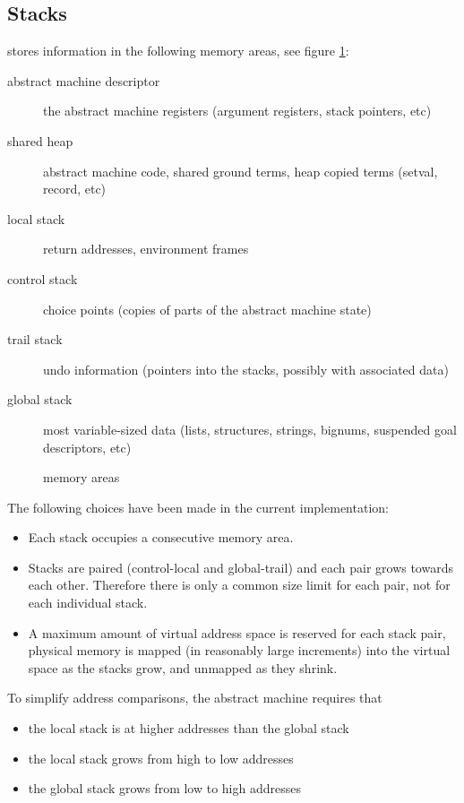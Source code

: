 \subsection{Stacks}
{\eclipse} stores information in the following memory areas, see figure
\ref{figstacks}:
\begin{description}
\item[abstract machine descriptor] the abstract machine registers
        (argument registers, stack pointers, etc)
\item[shared heap] abstract machine code, shared ground terms,
        heap copied terms (setval, record, etc)
\item[local stack] return addresses, environment frames
\item[control stack] choice points (copies of parts of the
        abstract machine state)
\item[trail stack] undo information (pointers into the stacks, possibly
        with associated data)
\item[global stack] most variable-sized data (lists, structures,
        strings, bignums, suspended goal descriptors, etc)
\end{description}
\begin{figure}
\label{figstacks}
\caption{{\eclipse} memory areas}
\end{figure}
The following choices have been made in the current implementation:
\begin{itemize}
\item Each stack occupies a consecutive memory area.
\item Stacks are paired (control-local and global-trail) and each pair
        grows towards each other.
        Therefore there is only a common size limit for each pair,
        not for each individual stack.
\item A maximum amount of virtual address space is reserved for each
        stack pair, physical memory is mapped (in reasonably large increments)
        into the virtual space as the stacks grow, and unmapped as they
        shrink.
\end{itemize}
To simplify address comparisons, the abstract machine requires that
\begin{itemize}
\item the local stack is at higher addresses than the global stack
\item the local stack grows from high to low addresses
\item the global stack grows from low to high addresses
\end{itemize}



